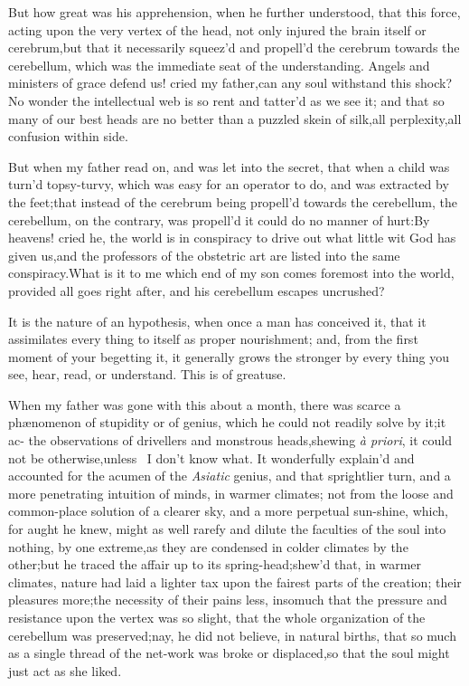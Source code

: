 \documentclass{article}
\begin{document}
But how great was his apprehension, when he further understood,
that this force, acting upon the very vertex of the head, not only
injured the brain itself or cerebrum,\tsk but that it
necessarily squeez’d and propell’d the cerebrum towards the
cerebellum, which was the immediate seat of the
understanding.\tsh\break
Angels and ministers of grace defend
us! cried my father,\tsk can any soul withstand this
shock?\tsk No wonder the intellectual web is so rent and tatter’d
as we see it; and that so many of our best heads are no better than
a puzzled skein of silk,\tsk all
perplexity,\tsk all confusion within side.

But when my father read on, and was let into the secret, that
when a child was turn’d topsy-turvy, which was easy for an operator
to do, and was extracted by the feet;\tsk that instead of the
cerebrum being propell’d towards the cerebellum, the cerebellum, on
the contrary, was propell’d  it could
do no manner of hurt:\tsh By heavens! cried he, the world
is in conspiracy to drive out what little wit God has given
us,\tsk and the professors of the obstetric art are listed
into the same conspiracy.\tsk What is it to me which end of my
son comes foremost into the world, provided all goes right after,
and his cerebellum escapes uncrushed?

It is the nature of an hypothesis, when once a man has conceived
it, that it assimilates every thing to itself as proper
nourishment; and, from the first moment of your begetting it, it
generally grows the stronger by every thing you see, hear, read, or
understand. This is of great\break use.

When my father was gone with this about a month, there was
scarce a phæ\-nomenon of stupidity or of genius, which he could
not readily solve by it;\tsk it ac-\break 
{}
the observations of drivellers and monstrous heads,\tsk shewing \textit{à
priori}, it could not be otherwise,\tsk unless \astiv\ I
don’t know what. It wonderfully explain’d and accounted for
the acumen of the \textit{Asiatic} genius, and that sprightlier turn,
and a more penetrating intuition of minds, in warmer climates; not
from the loose and common-place solution of a clearer sky, and a
more perpetual sun-shine, \etc\tsk\break which, for aught he knew,
might as well rarefy and dilute the faculties of the soul into
nothing, by one extreme,\tsk as they
are condensed in colder climates by the other;\tsh but he traced the affair up to
its spring-head;\tsk shew’d that, in warmer climates, nature had laid a lighter tax
upon the fairest parts of the creation;\tsk\break
their pleasures more;\tsk the necessity of their pains less, insomuch that the
pressure and resistance upon the vertex was so slight, that the whole organization
of the cerebellum was preserved;\tsh nay, he did not believe, in natural births,
that so much as a single thread of the net-work was broke or displaced,\tsh so that
the soul might just act as she liked.
\end{document}
